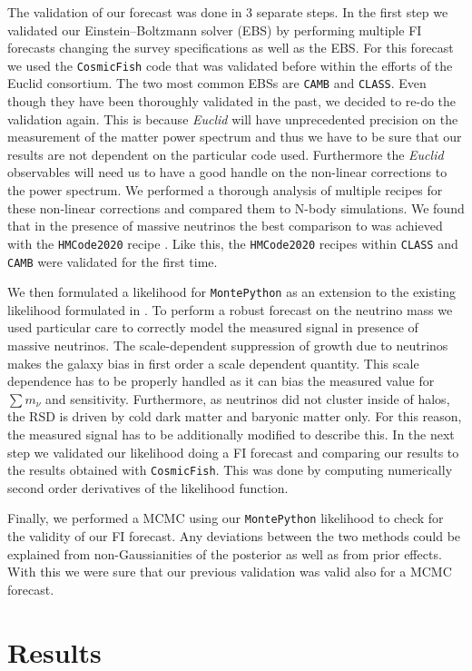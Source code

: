 \documentclass[a4paper,11pt]{article}
\newcommand{\euclid}{\textit{Euclid}\xspace}
\newcommand{\summnu}{\sum m_\nu}
\newcommand{\camb}{\texttt{CAMB}\xspace}
\newcommand{\class}{\texttt{CLASS}\xspace}
\newcommand{\montepython}{\texttt{MontePython}\xspace}
\newcommand{\cosmicfish}{\texttt{CosmicFish}\xspace}
\begin{document}
The validation of our forecast was done in 3 separate steps. In the first step we validated our Einstein--Boltzmann solver (EBS) by performing multiple FI forecasts changing the survey specifications as well as the EBS. For this forecast we used the \cosmicfish code that was validated before within the efforts of the Euclid consortium\cite{ISTF2020}. The two most common EBSs are \camb\cite{2011ascl.soft02026L} and \class\cite{Diego_Blas_2011}. Even though they have been thoroughly validated in the past, we decided to re-do the validation again. This is because \euclid will have unprecedented precision on the measurement of the matter power spectrum and thus we have to be sure that our results are not dependent on the particular code used. Furthermore the \euclid observables will need us to have a good handle on the non-linear corrections to the power spectrum. We performed a thorough analysis of multiple recipes for these non-linear corrections and compared them to N-body simulations. We found that in the presence of massive neutrinos the best comparison to was achieved with the \texttt{HMCode2020} recipe \cite{Mead_2021}. Like this, the \texttt{HMCode2020} recipes within \class and \camb were validated for the first time.

We then formulated a likelihood for \montepython\cite{Audren:2012wb} as an extension to the existing likelihood formulated in \cite{casas2023euclidvalidationmontepythonforecasting}. To perform a robust forecast on the neutrino mass we used particular care to correctly model the measured signal in presence of massive neutrinos. The scale-dependent suppression of growth due to neutrinos makes the galaxy bias in first order a scale dependent quantity. This scale dependence has to be properly handled as it can bias the measured value for $\summnu$ and sensitivity\cite{Vagnozzi_2018}. Furthermore, as neutrinos did not cluster inside of halos, the RSD is driven by cold dark matter and baryonic matter only\cite{Villaescusa_Navarro_2018}. For this reason, the measured signal has to be additionally modified to describe this. In the next step we validated our likelihood doing a FI forecast and comparing our results to the results obtained with \cosmicfish. This was done by computing numerically second order derivatives of the likelihood function.

Finally, we performed a MCMC using our \montepython likelihood to check for the validity of our FI forecast. Any deviations between the two methods could be explained from non-Gaussianities of the posterior as well as from prior effects. With this we were sure that our previous validation was valid also for a MCMC forecast.

\section{Results}




\end{document}
